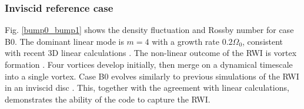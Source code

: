 \subsubsection{Inviscid reference case}
Fig. \ref{bump0_bump1} 
shows the density fluctuation and Rossby number for
case B0. The dominant linear mode is $m=4$ with a growth rate
$0.2\Omega_0$, consistent with recent 3D linear calculations 
\citep{meheut12,lin13}. 
The non-linear outcome of the RWI is vortex formation
\citep{li00}. Four vortices develop initially, then 
merge on a dynamical timescale into  
a single vortex. Case B0 evolves similarly to previous simulations of
the RWI in an inviscid disc 
\citep[e.g.][where more detailed analyses are 
given]{meheut10,meheut12b}. This, together with the agreement with
linear calculations, demonstrates the ability of the \pluto
code to capture the RWI. 

